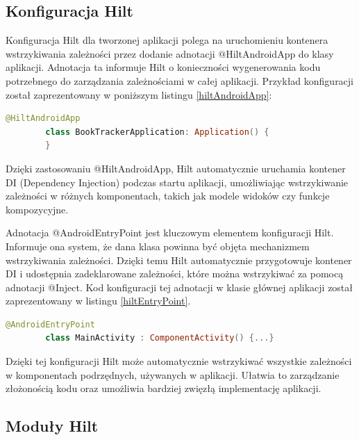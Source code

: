 \documentclass[12pt,twoside]{article}
\begin{document}
\subsection{Konfiguracja Hilt}

Konfiguracja Hilt dla tworzonej aplikacji polega na uruchomieniu kontenera wstrzykiwania zależności przez dodanie 
adnotacji @HiltAndroidApp do klasy aplikacji. Adnotacja ta informuje Hilt o konieczności wygenerowania kodu 
potrzebnego do zarządzania zależnościami w całej aplikacji. Przykład konfiguracji został zaprezentowany w poniższym 
listingu \ref{hiltAndroidApp}:

\begin{lstlisting}[language=Kotlin,caption=Konfiguracja Hilt w aplikacji, label={hiltAndroidApp}]
	@HiltAndroidApp
		class BookTrackerApplication: Application() {
		}
\end{lstlisting}
Dzięki zastosowaniu @HiltAndroidApp, Hilt automatycznie uruchamia kontener DI (Dependency Injection) podczas startu 
aplikacji, umożliwiając wstrzykiwanie zależności w różnych komponentach, takich jak modele widoków czy funkcje 
kompozycyjne.

Adnotacja @AndroidEntryPoint jest kluczowym elementem konfiguracji Hilt. Informuje ona system, że dana klasa 
powinna być objęta mechanizmem wstrzykiwania zależności. Dzięki temu Hilt automatycznie przygotowuje kontener DI i 
udostępnia zadeklarowane zależności, które można wstrzykiwać za pomocą adnotacji @Inject. Kod konfiguracji tej 
adnotacji w klasie głównej aplikacji został zaprezentowany w listingu \ref{hiltEntryPoint}.
\begin{lstlisting}[language=Kotlin,caption=Przykład użycia @AndroidEntryPoint w MainActivity, label={hiltEntryPoint}]
	@AndroidEntryPoint
		class MainActivity : ComponentActivity() {...}
\end{lstlisting}
Dzięki tej konfiguracji Hilt może automatycznie wstrzykiwać wszystkie zależności w komponentach podrzędnych, 
używanych w aplikacji. Ułatwia to zarządzanie złożonością kodu oraz umożliwia bardziej zwięzłą implementację 
aplikacji.

\subsection{Moduły Hilt}
\end{document}
